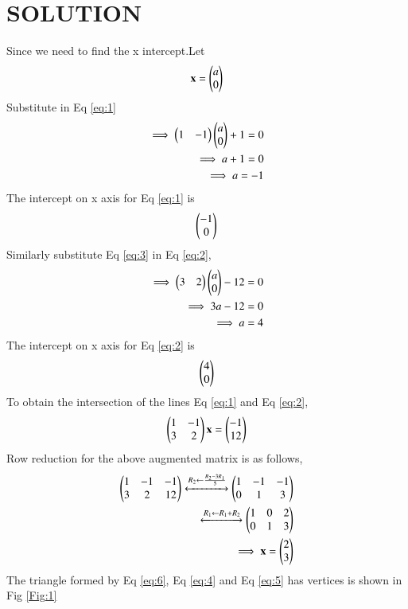\documentclass[journal,12pt,twocolumn]{IEEEtran}
\begin{document}
\section{SOLUTION}
Since we need to find the x intercept.Let
\begin{align}
    \mathbf{x}= \begin{pmatrix}a \\ 0\end{pmatrix}\label{eq:3}
\end{align}
Substitute in Eq \eqref{eq:1}
\begin{align}
\implies\begin{pmatrix}1 & -1\end{pmatrix}\begin{pmatrix}a \\ 0\end{pmatrix} + 1 = 0\\
\implies a + 1 = 0\\
\implies a = -1
\end{align}
The intercept on x axis for Eq \eqref{eq:1} is
\begin{align}
    \begin{pmatrix}-1 \\ 0\end{pmatrix}\label{eq:4}
\end{align}
Similarly substitute Eq \eqref{eq:3} in Eq \eqref{eq:2},
\begin{align}
\implies\begin{pmatrix}3 & 2\end{pmatrix}\begin{pmatrix}a \\ 0\end{pmatrix} - 12 = 0 \\
\implies 3a - 12 = 0\\
\implies a = 4
\end{align}
The intercept on x axis for Eq \eqref{eq:2} is
\begin{align}
    \begin{pmatrix}4 \\ 0\end{pmatrix}\label{eq:5}
\end{align}
To obtain the intersection of the lines Eq \eqref{eq:1} and Eq \eqref{eq:2},
\begin{align}
   \begin{pmatrix}1 & -1 \\ 3 & 2\end{pmatrix}\mathbf{x} = \begin{pmatrix}-1 \\ 12\end{pmatrix}
\end{align}
Row reduction for the above augmented matrix is as follows,
\begin{align}
\begin{pmatrix}1 & -1 & -1 \\ 3 & 2 & 12\end{pmatrix}
\xleftrightarrow{R_2\leftarrow \frac{R_2 - 3R_1}{5}}
\begin{pmatrix}1 & -1 & -1  \\ 0 & 1 & 3\end{pmatrix}\\
\xleftrightarrow{R_1\leftarrow R_1 + R_2}
\begin{pmatrix}1 & 0 & 2 \\ 0 & 1 & 3\end{pmatrix}\\
\implies \mathbf{x} = \begin{pmatrix}2 \\ 3\end{pmatrix} \label{eq:6}
\end{align}
The triangle formed by Eq \eqref{eq:6}, Eq \eqref{eq:4} and Eq \eqref{eq:5} has vertices is shown in Fig \ref{Fig:1}
\end{document}
